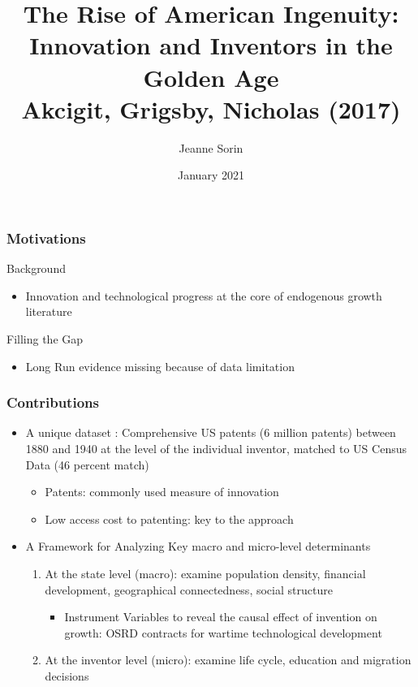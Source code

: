 \documentclass[aspectratio=169, 12pt, final]{beamer}
\title{The Rise of American Ingenuity: Innovation and Inventors in the Golden Age \\
Akcigit, Grigsby, Nicholas (2017)}
\author{Jeanne Sorin}
\date{January 2021}
\begin{document}
\frame{\titlepage}


\begin{frame}
\frametitle{Motivations}
Background
\begin{itemize}
	\item Innovation and technological progress at the core of endogenous growth literature
\end{itemize}
Filling the Gap
\begin{itemize}
	\item Long Run evidence missing because of data limitation
\end{itemize}
\end{frame}


\begin{frame}
\frametitle{Contributions}
\begin{itemize}
	\item A unique dataset : Comprehensive US patents (6 million patents) between 1880 and 1940 at the level of the individual inventor, matched to US Census Data (46 percent match)
	\begin{itemize}
		\item Patents: commonly used measure of innovation
		\item Low access cost to patenting: key to the approach
	\end{itemize}
	\item A Framework for Analyzing Key macro and micro-level determinants
	\begin{enumerate}
	\item At the state level (macro): examine population density, financial development, geographical connectedness, social structure
	\begin{itemize}
		\item Instrument Variables to reveal the causal effect of invention on growth: OSRD contracts for wartime technological development
	\end{itemize}
	\item At the inventor level (micro): examine life cycle, education and migration decisions
\end{enumerate}
\end{itemize}
\end{frame}


\iffalse
\end{document}
